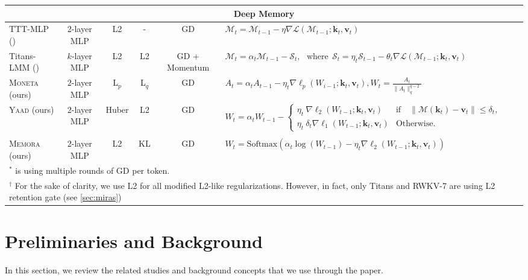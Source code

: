 \documentclass{article}
\newcommand{\ymodel}[0]{\textsc{Yaad}}
\newcommand{\mmodel}[0]{\textsc{Moneta}}
\newcommand{\xmodel}[0]{\textsc{Memora}}
\newcommand{\vk}[0]{\mathbf{k}}
\newcommand{\vvv}[0]{\mathbf{v}}
\newcommand{\M}[0]{\mathcal{M}}
\theoremstyle{plain}
\theoremstyle{definition}
\theoremstyle{remark}
\begin{document}
\begin{table}[t!]
{\begin{tabular}{l c c c c c c}
         \midrule
         \multicolumn{7}{c}{Deep Memory}\\
         \midrule
         TTT-MLP (\citeyear{sun2024learning})    & 2-layer MLP & L2 & - &  GD & \multicolumn{2}{l}{$\M_t = \M_{t-1} -\eta \nabla \mathcal{L}(\M_{t-1}; \vk_t, \vvv_t)$}\\
         \multirow{1}{*}{Titans-LMM (\citeyear{behrouz2024titans})} & \multirow{1}{*}{$k$-layer MLP} & \multirow{1}{*}{L2} & \multirow{1}{*}{L2} & \multirow{1}{*}{GD + Momentum} & \multicolumn{2}{l}{$\M_t = \alpha_t \M_{t-1} - \mathcal{S}_t, \:\:\: \text{where} \:\: \mathcal{S}_t = \eta_t \mathcal{S}_{t-1} - \theta_t \nabla \mathcal{L}(\M_{t-1}; \vk_t, \vvv_t)$}\\

         \midrule
       \mmodel{}  (\textcolor{c1}{ours}) & $2$-layer MLP & L$_p$ & L$_q$ & GD &  \multicolumn{2}{l}{$A_t = \alpha_t A_{t-1} - \eta_t \nabla \ell_p(W_{i-1};\vk_t, \vvv_t), W_t = \frac{A_t}{\|A_t\|_q^{q-2}}$}\\
        \multirow{2}{*}{\ymodel{}  (\textcolor{c1}{ours})} & \multirow{2}{*}{$2$-layer MLP} & \multirow{2}{*}{Huber} & \multirow{2}{*}{L2} & \multirow{2}{*}{GD} &  \multicolumn{2}{l}{\multirow{2}{*}{$ W_t = \alpha_t W_{t-1} - \begin{cases} 
    \eta_t \: \nabla \ell_2 (W_{t-1}; \vk_t, \vvv_t)   &  \text{if} \quad \| \M(\vk_t) - \vvv_t \| \leq \delta_t, \\
    \eta_t \: \delta_t \nabla  \ell_1 (W_{t-1}; \vk_t, \vvv_t)  & \text{Otherwise}.
    \end{cases} $}} \\
        &&&&&& \\
         &&&&&& \\
        \xmodel{}  (\textcolor{c1}{ours}) & $2$-layer MLP & L2 & KL & GD &  \multicolumn{2}{l}{$W_t = \mbox{Softmax}\left( \alpha_t \log(W_{t-1})  - \eta_t  \nabla \ell_2(W_{t-1};\vk_t, \vvv_t)\right)$}\\
    \toprule
    \multicolumn{7}{l}{$^*$ is using multiple rounds of GD per token. }\\
     \multicolumn{7}{l}{$^\dagger$ For the sake of clarity, we use L2 for all modified L2-like regularizations. However, in fact, only Titans and RWKV-7 are using L2 retention gate (see \autoref{sec:miras})}
    \end{tabular}
    }
    \label{tab:memory-perspective-all}
\end{table}

\section{Preliminaries and Background}\label{sec:background}
In this section, we review the related studies and background concepts that we use through the paper. 
\end{document}
